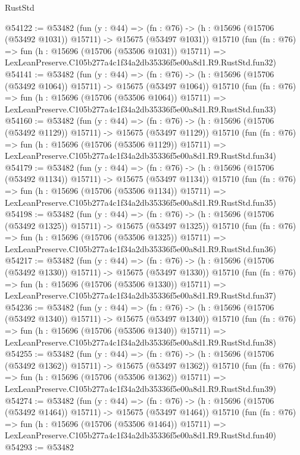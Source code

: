 \begin{lexlean}{RustStd}
\begin{coremodule}
@54122 := @53482
    (fun (y : @44) =>
    (fn : @76) -> (h : @15696 (@15706 (@53492 @1031)) @15711) -> @15675 (@53497 @1031))
    @15710
    (fun (fn : @76) =>
    fun (h : @15696 (@15706 (@53506 @1031)) @15711) =>
    LexLeanPreserve.C105b277a4c1f34a2db35336f5e00a8d1.R9.RustStd.fun32)
@54141 := @53482
    (fun (y : @44) =>
    (fn : @76) -> (h : @15696 (@15706 (@53492 @1064)) @15711) -> @15675 (@53497 @1064))
    @15710
    (fun (fn : @76) =>
    fun (h : @15696 (@15706 (@53506 @1064)) @15711) =>
    LexLeanPreserve.C105b277a4c1f34a2db35336f5e00a8d1.R9.RustStd.fun33)
@54160 := @53482
    (fun (y : @44) =>
    (fn : @76) -> (h : @15696 (@15706 (@53492 @1129)) @15711) -> @15675 (@53497 @1129))
    @15710
    (fun (fn : @76) =>
    fun (h : @15696 (@15706 (@53506 @1129)) @15711) =>
    LexLeanPreserve.C105b277a4c1f34a2db35336f5e00a8d1.R9.RustStd.fun34)
@54179 := @53482
    (fun (y : @44) =>
    (fn : @76) -> (h : @15696 (@15706 (@53492 @1134)) @15711) -> @15675 (@53497 @1134))
    @15710
    (fun (fn : @76) =>
    fun (h : @15696 (@15706 (@53506 @1134)) @15711) =>
    LexLeanPreserve.C105b277a4c1f34a2db35336f5e00a8d1.R9.RustStd.fun35)
@54198 := @53482
    (fun (y : @44) =>
    (fn : @76) -> (h : @15696 (@15706 (@53492 @1325)) @15711) -> @15675 (@53497 @1325))
    @15710
    (fun (fn : @76) =>
    fun (h : @15696 (@15706 (@53506 @1325)) @15711) =>
    LexLeanPreserve.C105b277a4c1f34a2db35336f5e00a8d1.R9.RustStd.fun36)
@54217 := @53482
    (fun (y : @44) =>
    (fn : @76) -> (h : @15696 (@15706 (@53492 @1330)) @15711) -> @15675 (@53497 @1330))
    @15710
    (fun (fn : @76) =>
    fun (h : @15696 (@15706 (@53506 @1330)) @15711) =>
    LexLeanPreserve.C105b277a4c1f34a2db35336f5e00a8d1.R9.RustStd.fun37)
@54236 := @53482
    (fun (y : @44) =>
    (fn : @76) -> (h : @15696 (@15706 (@53492 @1340)) @15711) -> @15675 (@53497 @1340))
    @15710
    (fun (fn : @76) =>
    fun (h : @15696 (@15706 (@53506 @1340)) @15711) =>
    LexLeanPreserve.C105b277a4c1f34a2db35336f5e00a8d1.R9.RustStd.fun38)
@54255 := @53482
    (fun (y : @44) =>
    (fn : @76) -> (h : @15696 (@15706 (@53492 @1362)) @15711) -> @15675 (@53497 @1362))
    @15710
    (fun (fn : @76) =>
    fun (h : @15696 (@15706 (@53506 @1362)) @15711) =>
    LexLeanPreserve.C105b277a4c1f34a2db35336f5e00a8d1.R9.RustStd.fun39)
@54274 := @53482
    (fun (y : @44) =>
    (fn : @76) -> (h : @15696 (@15706 (@53492 @1464)) @15711) -> @15675 (@53497 @1464))
    @15710
    (fun (fn : @76) =>
    fun (h : @15696 (@15706 (@53506 @1464)) @15711) =>
    LexLeanPreserve.C105b277a4c1f34a2db35336f5e00a8d1.R9.RustStd.fun40)
@54293 := @53482

\end{coremodule}
\end{lexlean}
